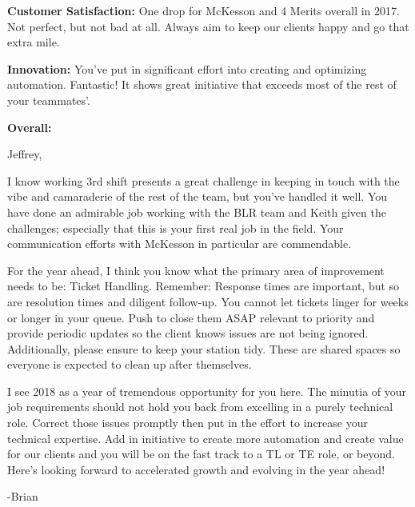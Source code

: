 


\begin{cvparagraph}
{\bfseries Customer Satisfaction:} One drop for McKesson and 4 Merits overall in 2017. 
Not perfect, but not bad at all. 
Always aim to keep our clients happy and go that extra mile.

{\bfseries Innovation:} You've put in significant effort into creating and optimizing automation. 
Fantastic! It shows great initiative that exceeds most of the rest of your teammates'.

{\bfseries Overall:}

Jeffrey,

I know working 3rd shift presents a great challenge in keeping in touch with the vibe and camaraderie of the rest of the team, but you've handled it well. 
You have done an admirable job working with the BLR team and Keith given the challenges; especially that this is your first real job in the field. 
Your communication efforts with McKesson in particular are commendable.

For the year ahead, I think you know what the primary area of improvement needs to be: Ticket Handling. 
Remember: Response times are important, but so are resolution times and diligent follow-up. 
You cannot let tickets linger for weeks or longer in your queue. 
Push to close them ASAP relevant to priority and provide periodic updates so the client knows issues are not being ignored.
Additionally, please ensure to keep your station tidy. 
These are shared spaces so everyone is expected to clean up after themselves.

I see 2018 as a year of tremendous opportunity for you here. 
The minutia of your job requirements should not hold you back from excelling in a purely technical role. 
Correct those issues promptly then put in the effort to increase your technical expertise. 
Add in initiative to create more automation and create value for our clients and you will be on the fast track to a TL or TE role, or beyond.  
Here's looking forward to accelerated growth and evolving in the year ahead!

-Brian
\end{cvparagraph}


